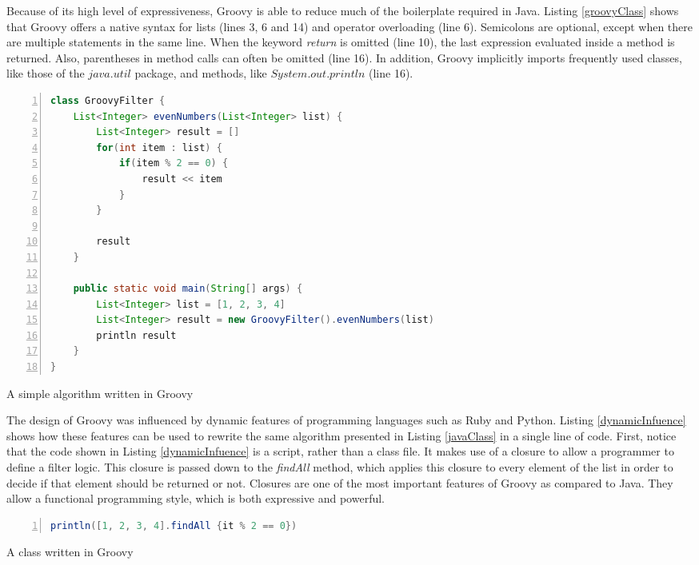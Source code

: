 \documentclass[msc]{ppgccufmg}
\begin{document}
Because of its high level of expressiveness, Groovy is able to reduce much of the boilerplate required in Java.
Listing \ref{groovyClass} shows that Groovy offers a native syntax for lists (lines 3, 6 and 14) and operator overloading (line 6). 
Semicolons are optional, except when there are multiple statements in the same line. 
When the keyword \emph{return} is omitted (line 10), the last expression evaluated inside a method is returned. 
Also, parentheses in method calls can often be omitted (line 16).
In addition, Groovy implicitly imports frequently used classes, like those of the $java.util$ package, and methods, like $System.out.println$ (line  16).

\begin{Listing}[ht]
\begin{lstlisting}[basicstyle=\ttfamily, language=Java,tabsize=2,breaklines=true,numbers=left]
class GroovyFilter {
	List<Integer> evenNumbers(List<Integer> list) {
		List<Integer> result = []
		for(int item : list) {
			if(item % 2 == 0) {
				result << item
			}
		}

		result
	}

	public static void main(String[] args) {
		List<Integer> list = [1, 2, 3, 4]
		List<Integer> result = new GroovyFilter().evenNumbers(list)
		println result
	}
}
\end{lstlisting}
\caption{A simple algorithm written in Groovy}
\label{groovyClass}
\end{Listing}

The design of Groovy was influenced by dynamic features of programming languages such as Ruby and Python.
Listing \ref{dynamicInfuence} shows how these features can be used to rewrite the same algorithm presented in Listing \ref{javaClass} in a single line of code. 
First, notice that the code shown in Listing \ref{dynamicInfuence}  is a script, rather than a class file.
It makes use of a closure to allow a programmer to define a filter logic.
This closure is passed down to the \emph{findAll} method, which  applies this closure to every element of the list in order to decide if that element should be returned or not.
Closures are one of the most important features of Groovy as compared to Java.
They allow a functional programming style, which is both expressive and powerful.

\begin{Listing}[ht]
\begin{lstlisting}[basicstyle=\ttfamily, language=Java,tabsize=2,breaklines=true,numbers=left]
println([1, 2, 3, 4].findAll {it % 2 == 0})
\end{lstlisting}
\caption{A class written in Groovy}
\label{dynamicInfuence}
\end{Listing}
\end{document}
